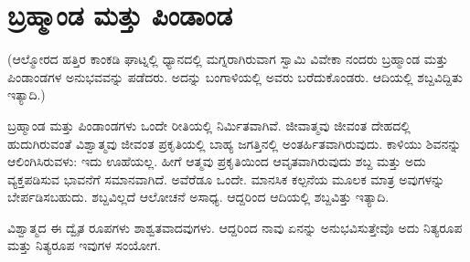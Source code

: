 
\chapter{ಬ್ರಹ್ಮಾಂಡ ಮತ್ತು ಪಿಂಡಾಂಡ}

(ಆಲ್ಮೋರದ ಹತ್ತಿರ ಕಾಂಕಡಿ ಘಾಟ್ನಲ್ಲಿ ಧ್ಯಾನದಲ್ಲಿ ಮಗ್ನರಾಗಿರುವಾಗ ಸ್ವಾಮಿ ವಿವೇಕಾ ನಂದರು ಬ್ರಹ್ಮಾಂಡ ಮತ್ತು ಪಿಂಡಾಂಡಗಳ ಅನುಭವವನ್ನು ಪಡೆದರು. ಅದನ್ನು ಬಂಗಾಳಿಯಲ್ಲಿ ಅವರು ಬರೆದುಕೊಂಡರು. ಆದಿಯಲ್ಲಿ ಶಬ್ದವಿದ್ದಿತು ಇತ್ಯಾದಿ.)

ಬ್ರಹ್ಮಾಂಡ ಮತ್ತು ಪಿಂಡಾಂಡಗಳು ಒಂದೇ ರೀತಿಯಲ್ಲಿ ನಿರ್ಮಿತವಾಗಿವೆ. ಜೀವಾತ್ಮವು ಜೀವಂತ ದೇಹದಲ್ಲಿ ಹುದುಗಿರುವಂತೆ ವಿಶ್ವಾತ್ಮವು ಜೀವಂತ ಪ್ರಕೃತಿಯಲ್ಲಿ ಬಾಹ್ಯ ಜಗತ್ತಿನಲ್ಲಿ ಅಂತರ್ಹಿತವಾಗಿರುವುದು. ಕಾಳಿಯು ಶಿವನನ್ನು ಆಲಿಂಗಿಸಿರುವಳು: ಇದು ಊಹೆಯಲ್ಲ. ಹೀಗೆ ಆತ್ಮವು ಪ್ರಕೃತಿಯಿಂದ ಆವೃತವಾಗಿರುವುದು ಶಬ್ದ ಮತ್ತು ಅದು ವ್ಯಕ್ತಪಡಿಸುವ ಭಾವನೆಗೆ ಸಮಾನವಾಗಿದೆ. ಅವೆರೆಡೂ ಒಂದೇ. ಮಾನಸಿಕ ಕಲ್ಪನೆಯ ಮೂಲಕ ಮಾತ್ರ ಅವುಗಳನ್ನು ಬೇರ್ಪಡಿಸಬಹುದು. ಶಬ್ದವಿಲ್ಲದೆ ಆಲೋಚನೆ ಅಸಾಧ್ಯ. ಆದ್ದರಿಂದ ಆದಿಯಲ್ಲಿ ಶಬ್ದವಿತ್ತು ಇತ್ಯಾದಿ.

ವಿಶ್ವಾತ್ಮದ ಈ ದ್ವೈತ ರೂಪಗಳು ಶಾಶ್ವತವಾದವುಗಳು. ಆದ್ದರಿಂದ ನಾವು ಏನನ್ನು ಅನುಭವಿಸುತ್ತೇವೊ ಅದು ನಿತ್ಯರೂಪ ಮತ್ತು ನಿತ್ಯರೂಪ ಇವುಗಳ ಸಂಯೋಗ.

